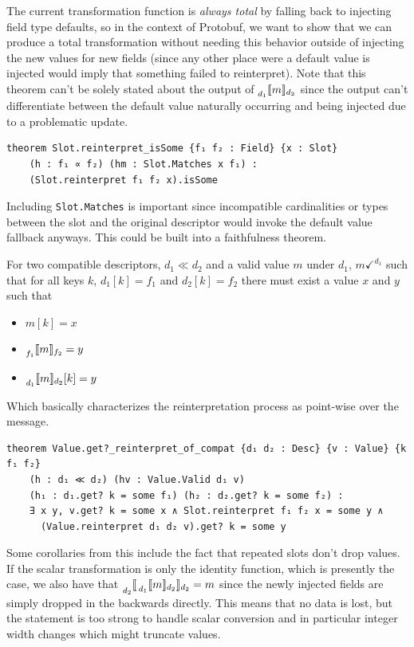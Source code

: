 The current transformation function is \emph{always total} by falling back to
injecting field type defaults, so in the context of Protobuf, we want to show
that we can produce a total transformation without needing this behavior outside
of injecting the new values for new fields (since any other place were a default
value is injected would imply that something failed to reinterpret). Note that
this theorem can't be solely stated about the output of
$\prescript{}{d_1}{\llbracket{} m \rrbracket{}}_{d_2}$ since the output can't differentiate between the
default value naturally occurring and being injected due to a problematic
update.

\begin{verbatim}
theorem Slot.reinterpret_isSome {f₁ f₂ : Field} {x : Slot}
    (h : f₁ ∝ f₂) (hm : Slot.Matches x f₁) :
    (Slot.reinterpret f₁ f₂ x).isSome
\end{verbatim}

Including \texttt{Slot.Matches} is important since incompatible cardinalities or
types between the slot and the original descriptor would invoke the default
value fallback anyways. This could be built into a faithfulness theorem.

\vspace{1em}
\begin{theorem}[Faithfulness]\label{thm:faith}
  For two compatible descriptors, $d_1 \ll d_2$ and a valid value $m$ under
  $d_1$, $m \checkmark^{d_1}$ such that for all keys $k$, $d_1[k] = f_1$ and $d_2[k] =
  f_2$ there must exist a value $x$ and $y$ such that
  \begin{itemize}
  \item $m[k] = x$
  \item $\prescript{}{f_1}{\llbracket{} m \rrbracket{}}_{f_2} = y$
  \item $\prescript{}{d_1}{\llbracket{} m \rrbracket{}}_{d_2}[k] = y$
  \end{itemize}
\end{theorem}

Which basically characterizes the reinterpretation process as point-wise over the
message.

\begin{verbatim}
theorem Value.get?_reinterpret_of_compat {d₁ d₂ : Desc} {v : Value} {k f₁ f₂}
    (h : d₁ ≪ d₂) (hv : Value.Valid d₁ v)
    (h₁ : d₁.get? k = some f₁) (h₂ : d₂.get? k = some f₂) :
    ∃ x y, v.get? k = some x ∧ Slot.reinterpret f₁ f₂ x = some y ∧
      (Value.reinterpret d₁ d₂ v).get? k = some y
\end{verbatim}

Some corollaries from this include the fact that repeated slots don't drop
values. If the scalar transformation is only the identity function, which is
presently the case, we also have that
$\prescript{}{d_2}{\llbracket{} \prescript{}{d_1}{\llbracket{} m \rrbracket{}}_{d_2} \rrbracket{}}_{d_{2}} = m$ since the newly injected
fields are simply dropped in the backwards directly. This means that no data is
lost, but the statement is too strong to handle scalar conversion and in
particular integer width changes which might truncate values.

